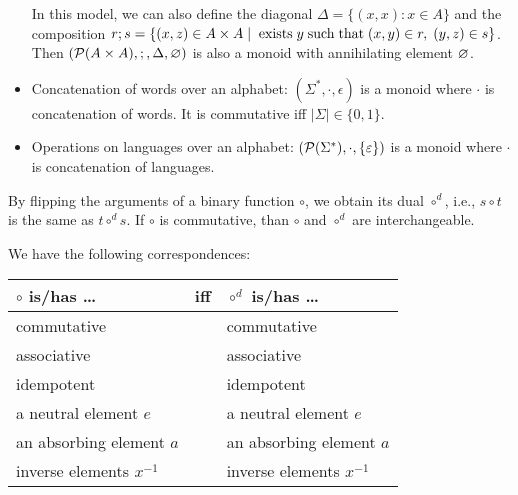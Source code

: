 \begin{example}
\begin{itemize}
In this model, we can also define the diagonal $\Delta=\{(x,x):x\in A\}$ and the composition $r;s=\{(x,z)\in A\times A\;|\;\;\mathrm{exists}\; y\;\mathrm{such}\;\mathrm{that}\; (x,y)\in r,\;(y,z)\in s\}$.
Then $(\mathcal{P}(A\times A),;,\Delta,\varnothing)$ is also a monoid with annihilating element $\varnothing$.
\item Concatenation of words over an alphabet: $(\Sigma^*,\cdot,\epsilon)$ is a monoid where $\cdot$ is concatenation of words. It is commutative iff $|\Sigma|\in\{0,1\}$.
\item Operations on languages over an alphabet: $(\mathcal{P}(\Sigma^*),\cdot,\{\varepsilon\})$ is a monoid where $\cdot$ is concatenation of languages.
\end{itemize}
\end{example}

\begin{remark}[Duality]\label{rem:binaryfunc:dual}
By flipping the arguments of a binary function $\circ$, we obtain its dual $\circ^d$, i.e., $s\circ t$ is the same as $t\circ^d s$.
If $\circ$ is commutative, than $\circ$ and $\circ^d$ are interchangeable.

We have the following correspondences:
\begin{center}
 \begin{tabular}{|lcl|}
 \hline
 $\circ$ is/has \ldots & iff & $\circ^d$ is/has \ldots\\
 \hline
 commutative && commutative \\
 associative && associative \\
 idempotent  && idempotent \\
 a neutral element $e$ && a neutral element $e$ \\
 an absorbing element $a$ && an absorbing element $a$ \\
 inverse elements $x^{-1}$ && inverse elements $x^{-1}$\\
 \hline
 \end{tabular}
\end{center}
\end{remark}


